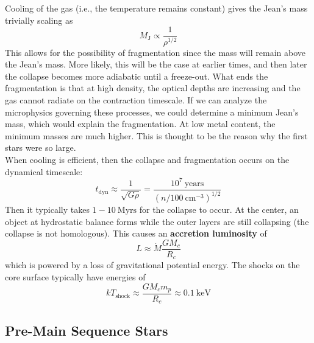 \documentclass[10pt]{article}
\numberwithin{equation}{section}
\newcommand{\n}{\noindent}
\begin{document}
  \n Cooling of the gas (i.e., the temperature remains constant) gives
  the Jean's mass trivially scaling as
  \begin{equation}
    \label{eq:65}
    M_{\mathrm{J}}\propto \frac{1}{\rho^{1/2}}
  \end{equation}
  This allows for the possibility of fragmentation since the mass will
  remain above the Jean's mass. More likely, this will be the case at
  earlier times, and then later the collapse becomes more adiabatic
  until a freeze-out. What ends the fragmentation is that at high
  density, the optical depths are increasing and the gas cannot
  radiate on the contraction timescale. If we can analyze the
  microphysics governing these processes, we could determine a minimum
  Jean's mass, which would explain the fragmentation. At low metal
  content, the minimum masses are much higher. This is thought to be
  the reason why the first stars were so large.\\

  \n When cooling is efficient, then the collapse and fragmentation
  occurs on the dynamical timescale:
  \begin{equation}
    \label{eq:66}
    t_{\mathrm{dyn}}\approx \frac{1}{\sqrt{G\rho}}=\frac{10^7\
      \mathrm{years}}{(n/100\ \mathrm{cm^{-3}})^{1/2}}
  \end{equation}
  Then it typically takes $1-10\ \mathrm{Myrs}$ for the collapse to
  occur. At the center, an object at hydrostatic balance forms while
  the outer layers are still collapsing (the collapse is not
  homologous). This causes an \textbf{accretion luminosity} of
  \begin{equation}
    \label{eq:67}
    L\approx \dot{M}\frac{G M_c}{R_c}
  \end{equation}
  which is powered by a loss of gravitational potential energy. The
  shocks on the core surface typically have energies of
  \begin{equation}
    \label{eq:68}
    kT_{\mathrm{shock}}\approx \frac{GM_c m_p}{R_c}\approx 0.1\ \mathrm{keV}
  \end{equation}

  \subsection{Pre-Main Sequence Stars}
  \label{sec:pre-main-sequence}
\end{document}

